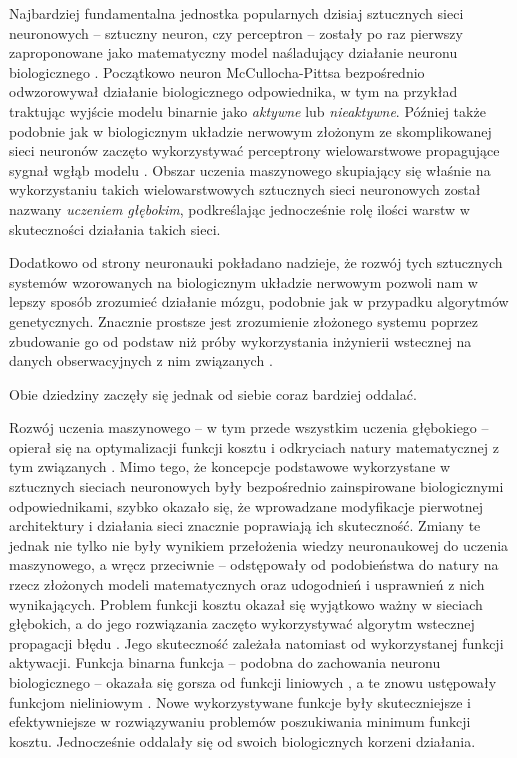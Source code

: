 Najbardziej fundamentalna jednostka popularnych dzisiaj sztucznych sieci neuronowych -- sztuczny neuron, czy perceptron -- zostały po raz pierwszy zaproponowane jako matematyczny model naśladujący działanie neuronu biologicznego \cite{mcculloch1943logical}.
Początkowo neuron McCullocha-Pittsa bezpośrednio odwzorowywał działanie biologicznego odpowiednika, w tym na przykład traktując wyjście modelu binarnie jako \emph{aktywne} lub \emph{nieaktywne}.
Później także podobnie jak w biologicznym układzie nerwowym złożonym ze skomplikowanej sieci neuronów zaczęto wykorzystywać perceptrony wielowarstwowe propagujące sygnał wgłąb modelu \cite{rosenblatt1961principles}.
Obszar uczenia maszynowego skupiający się właśnie na wykorzystaniu takich wielowarstwowych sztucznych sieci neuronowych został nazwany \emph{uczeniem głębokim}, podkreślając jednocześnie rolę ilości warstw w skuteczności działania takich sieci.

Dodatkowo od strony neuronauki pokładano nadzieje, że rozwój tych sztucznych systemów wzorowanych na biologicznym układzie nerwowym pozwoli nam w lepszy sposób zrozumieć działanie mózgu, podobnie jak w przypadku algorytmów genetycznych.
Znacznie prostsze jest zrozumienie złożonego systemu poprzez zbudowanie go od podstaw niż próby wykorzystania inżynierii wstecznej na danych obserwacyjnych z nim związanych \cite{braitenberg1986vehicles}.

Obie dziedziny zaczęły się jednak od siebie coraz bardziej oddalać.

Rozwój uczenia maszynowego -- w tym przede wszystkim uczenia głębokiego -- opierał się na optymalizacji funkcji kosztu i odkryciach natury matematycznej z tym związanych \cite{sutskever2013importance}.
Mimo tego, że koncepcje podstawowe wykorzystane w sztucznych sieciach neuronowych były bezpośrednio zainspirowane biologicznymi odpowiednikami, szybko okazało się, że wprowadzane modyfikacje pierwotnej architektury i działania sieci znacznie poprawiają ich skuteczność.
Zmiany te jednak nie tylko nie były wynikiem przełożenia wiedzy neuronaukowej do uczenia maszynowego, a wręcz przeciwnie -- odstępowały od podobieństwa do natury na rzecz złożonych modeli matematycznych oraz udogodnień i usprawnień z nich wynikających.
Problem funkcji kosztu okazał się wyjątkowo ważny w sieciach głębokich, a do jego rozwiązania zaczęto wykorzystywać algorytm wstecznej propagacji błędu \cite{rumelhart1985learning}.
Jego skuteczność zależała natomiast od wykorzystanej funkcji aktywacji.
Funkcja binarna funkcja -- podobna do zachowania neuronu biologicznego -- okazała się gorsza od funkcji liniowych \cite{minsky2017perceptrons}, a te znowu ustępowały funkcjom nieliniowym \cite{haykin1994neural}.
Nowe wykorzystywane funkcje były skuteczniejsze i efektywniejsze \cite{sharma2017activation} w rozwiązywaniu problemów poszukiwania minimum funkcji kosztu.
Jednocześnie oddalały się od swoich biologicznych korzeni działania.

